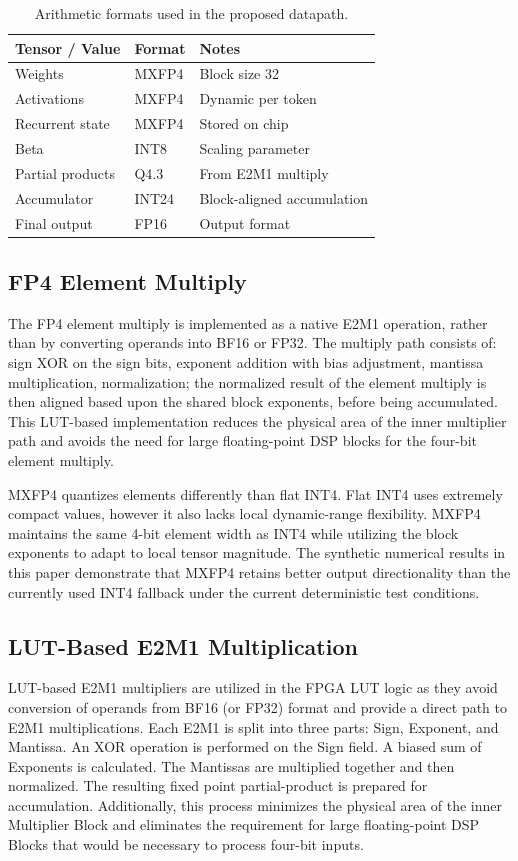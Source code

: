 ﻿\documentclass[conference]{IEEEtran}
\begin{document}
\begin{table}[t]
\centering
\caption{Arithmetic formats used in the proposed datapath.}
\label{tab:data_formats}
\footnotesize
\renewcommand{\arraystretch}{1.0}
\setlength{\tabcolsep}{6pt}
\begin{tabularx}{\linewidth}{llX}
\toprule
Tensor / Value & Format & Notes \\
\midrule
Weights & MXFP4 & Block size 32 \\
Activations & MXFP4 & Dynamic per token \\
Recurrent state & MXFP4 & Stored on chip \\
Beta & INT8 & Scaling parameter \\
Partial products & Q4.3 & From E2M1 multiply \\
Accumulator & INT24 & Block-aligned accumulation \\
Final output & FP16 & Output format \\
\bottomrule
\end{tabularx}
\end{table}

\subsection{FP4 Element Multiply}
The FP4 element multiply is implemented as a native E2M1 operation, rather than by converting operands into BF16 or FP32. The multiply path consists of: sign XOR on the sign bits, exponent addition with bias adjustment, mantissa multiplication, normalization; the normalized result of the element multiply is then aligned based upon the shared block exponents, before being accumulated. This LUT-based implementation reduces the physical area of the inner multiplier path and avoids the need for large floating-point DSP blocks for the four-bit element multiply.

MXFP4 quantizes elements differently than flat INT4. Flat INT4 uses extremely compact values, however it also lacks local dynamic-range flexibility. MXFP4 maintains the same 4-bit element width as INT4 while utilizing the block exponents to adapt to local tensor magnitude. The synthetic numerical results in this paper demonstrate that MXFP4 retains better output directionality than the currently used INT4 fallback under the current deterministic test conditions.

\subsection{LUT-Based E2M1 Multiplication}
LUT-based E2M1 multipliers are utilized in the FPGA LUT logic as they avoid conversion of operands from BF16 (or FP32) format and provide a direct path to E2M1 multiplications. Each E2M1 is split into three parts: Sign, Exponent, and Mantissa. An XOR operation is performed on the Sign field. A biased sum of Exponents is calculated. The Mantissas are multiplied together and then normalized. The resulting fixed point partial-product is prepared for accumulation. Additionally, this process minimizes the physical area of the inner Multiplier Block and eliminates the requirement for large floating-point DSP Blocks that would be necessary to process four-bit inputs.
\end{document}
